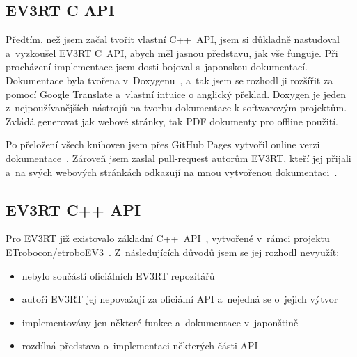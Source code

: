\subsection{EV3RT C API}


Předtím, než jsem začal tvořit vlastní C++~API, jsem si důkladně nastudoval a~vyzkoušel EV3RT C~API, abych měl jasnou představu, jak vše funguje.
% 
% 
% 
% 
Při procházení implementace jsem dosti bojoval s~japonskou dokumentací.
% 
% 
Dokumentace byla tvořena v~Doxygenu~\cite{doxygen-web}, a~tak jsem se rozhodl ji rozšířit za pomocí Google Translate a~vlastní intuice o anglický překlad.
Doxygen je jeden z~nejpoužívanějších nástrojů na tvorbu dokumentace k softwarovým projektům. 
Zvládá generovat jak webové stránky, tak PDF dokumenty pro offline použití.

Po přeložení všech knihoven jsem přes GitHub Pages vytvořil online verzi dokumentace~\cite{roboticsbrno-EV3RT-API-Reference}.
Zároveň jsem zaslal pull-request autorům EV3RT, kteří jej přijali a~na svých webových stránkách odkazují na mnou vytvořenou dokumentaci~\cite{EV3RT-git-web_documentation}.
% 
% 
%
%

\subsection{EV3RT C++ API}


Pro EV3RT již existovalo základní C++~API~\cite{EV3RT-git-web_documentation}, vytvořené v~rámci projektu ETrobocon/etroboEV3~\cite{ev3rt-cpp-API-ETrobocon}. Z~následujících důvodů jsem se jej rozhodl nevyužít:
 
\begin{itemize}
    \item nebylo součástí oficiálních EV3RT repozitářů
    \item autoři EV3RT jej nepovažují za oficiální API a~nejedná se o~jejich výtvor
    \item implementovány jen některé funkce a~dokumentace v~japonštině
% 
% 
%
%
    \item rozdílná představa o~implementaci některých části API     
\end{itemize}

